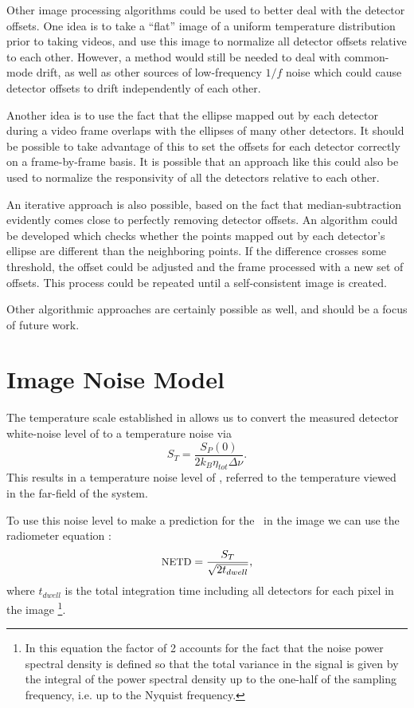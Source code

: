 Other image processing algorithms could be used to better deal with the detector offsets.
One idea is to take a ``flat'' image of a uniform temperature distribution prior to taking videos, and use this image to normalize all detector offsets relative to each other.
However, a method would still be needed to deal with common-mode drift, as well as other sources of low-frequency $1/f$ noise which could cause detector offsets to drift independently of each other.

Another idea is to use the fact that the ellipse mapped out by each detector during a video frame overlaps with the ellipses of many other detectors.
It should be possible to take advantage of this to set the offsets for each detector correctly on a frame-by-frame basis.
It is possible that an approach like this could also be used to normalize the responsivity of all the detectors relative to each other.

An iterative approach is also possible, based on the fact that median-subtraction evidently comes close to perfectly removing detector offsets.
An algorithm could be developed which checks whether the points mapped out by each detector's ellipse are different than the neighboring points.
If the difference crosses some threshold, the offset could be adjusted and the frame processed with a new set of offsets.
This process could be repeated until a self-consistent image is created.

Other algorithmic approaches are certainly possible as well, and should be a focus of future work.

\section{Image Noise Model}\label{sec:ch8-noise-model}


The temperature scale established in  allows us to convert the measured detector white-noise level of  to a temperature noise via
\begin{equation}
  S_T = \frac{S_P(0)}{2 k_B \eta_{tot} \Delta \nu}.
\end{equation}
This results in a temperature noise level of , referred to the temperature viewed in the far-field of the system.

To use this noise level to make a prediction for the \NETD\ in the image we can use the radiometer equation \cite{kraus_radio_1986}:
\begin{equation} \label{eqn:ch8-radiometer}
  \text{{\small NETD}} = \frac{S_T}{\sqrt{2 t_{dwell}}},
\end{equation}
where $t_{dwell}$ is the total integration time including all detectors for each pixel in the image%
\footnote{%
In this equation the factor of 2 accounts for the fact that the noise power spectral density is defined so that the total variance in the signal is given by the integral of the power spectral density up to the one-half of the sampling frequency, i.e. up to the Nyquist frequency.
}.

